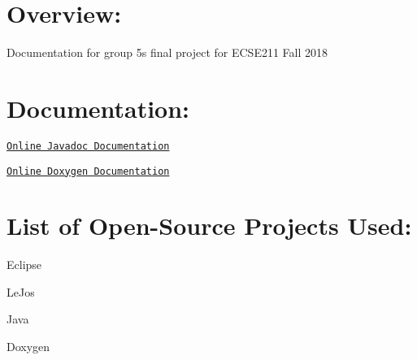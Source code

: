 \section*{Overview\+:}

Documentation for group 5\textquotesingle{}s final project for E\+C\+S\+E211 Fall 2018

\section*{Documentation\+:}

\href{https://ecse211-group5.herokuapp.com/doc/}{\tt Online Javadoc Documentation}

\href{https://ecse211-group5.herokuapp.com/doc/doxygen/html/}{\tt Online Doxygen Documentation}

\section*{List of Open-\/\+Source Projects Used\+:}


\begin{DoxyItemize}
\item Eclipse
\item Le\+Jos
\item Java
\item Doxygen 
\end{DoxyItemize}
